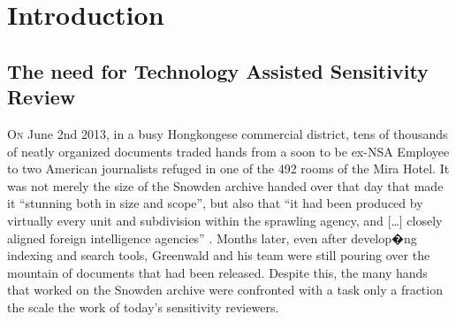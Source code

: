 \documentclass[\version]{l4proj}
\begin{document}
\tableofcontents

%
%
%
%
%
%
%
%



\chapter{Introduction}


\section{The need for Technology Assisted Sensitivity Review}

\lettrine[lines=3,nindent=0em]{O}{n} June 2nd 2013, in a busy Hongkongese commercial district, tens of thousands of neatly organized documents traded hands from a soon to be ex-NSA Employee to two American journalists refuged in one of the 492 rooms of the Mira Hotel.
It was not merely the size of the Snowden archive handed over that day that made it ``stunning both in size and scope'', but also that ``it had been produced by virtually every unit and subdivision within the sprawling agency, and [\ldots] closely aligned foreign intelligence agencies'' \autocite[77]{greenwaldNoPlaceHide2014}.
Months later, even after develop�ng indexing and search tools, Greenwald and his team were still pouring over the mountain of documents that had been released.
Despite this, the many hands that worked on the Snowden archive were confronted with a task only a fraction the scale the work of today's sensitivity reviewers.
\end{document}
